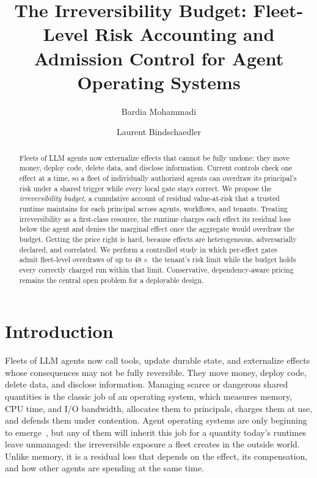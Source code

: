 \documentclass[sigconf]{acmart}
\begin{document}
\title[The Irreversibility Budget]{The Irreversibility Budget: Fleet-Level Risk Accounting and Admission Control for Agent Operating Systems}


\author{Bardia Mohammadi}

\author{Laurent Bindschaedler}

\begin{abstract}
Fleets of LLM agents now externalize effects that cannot be fully undone: they move money, deploy code, delete data, and disclose information. Current controls check one effect at a time, so a fleet of individually authorized agents can overdraw its principal's risk under a shared trigger while every local gate stays correct. We propose the \emph{irreversibility budget}, a cumulative account of residual value-at-risk that a trusted runtime maintains for each principal across agents, workflows, and tenants. Treating irreversibility as a first-class resource, the runtime charges each effect its residual loss below the agent and denies the marginal effect once the aggregate would overdraw the budget. Getting the price right is hard, because effects are heterogeneous, adversarially declared, and correlated. We perform a controlled study in which per-effect gates admit fleet-level overdraws of up to $48\times$ the tenant's risk limit while the budget holds every correctly charged run within that limit. Conservative, dependency-aware pricing remains the central open problem for a deployable design.
\end{abstract}

\maketitle
\raggedbottom

\section{Introduction}
Fleets of LLM agents now call tools, update durable state, and externalize effects whose consequences may not be fully reversible. They move money, deploy code, delete data, and disclose information. Managing scarce or dangerous shared quantities is the classic job of an operating system, which measures memory, CPU time, and I/O bandwidth, allocates them to principals, charges them at use, and defends them under contention. Agent operating systems are only beginning to emerge~\cite{Packer2023MemGPT,Mei2025AIOS}, but any of them will inherit this job for a quantity today's runtimes leave unmanaged: the irreversible exposure a fleet creates in the outside world. Unlike memory, it is a residual loss that depends on the effect, its compensation, and how other agents are spending at the same time.
\end{document}
